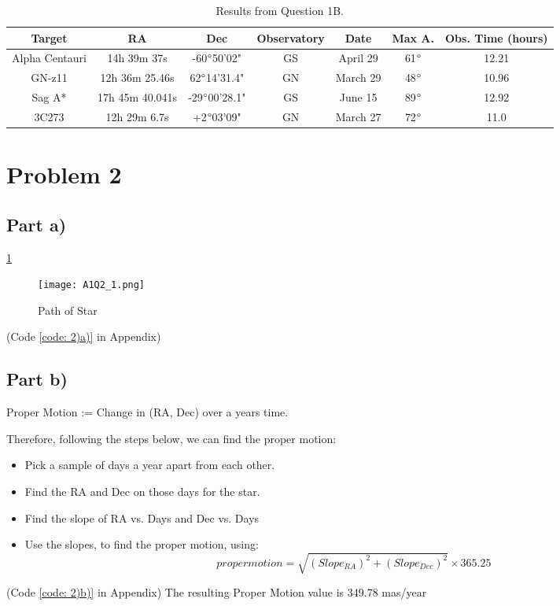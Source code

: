 \documentclass{article}
\begin{document}
        \begin{table}[h!]
        \centering
        \begin{tabular}{|c| c| c| c| c | c | c|} 
         \hline
         Target & RA & Dec & Observatory & Date & Max A. & Obs. Time (hours) \\
         \hline
         \hline
         Alpha Centauri & 14h 39m 37s & -60$\degree$50'02" & GS & April 29 & 61$\degree$ & 12.21 \\
         \hline
         GN-z11 & 12h 36m 25.46s & 62$\degree$14'31.4" & GN & March 29 & 48$\degree$ & 10.96 \\
         \hline
         Sag A* & 17h 45m 40.041s & -29$\degree$00'28.1" & GS & June 15 & 89$\degree$ & 12.92 \\
         \hline
         3C273 & 12h 29m 6.7s & +2$\degree$03'09" & GN & March 27 & 72$\degree$ & 11.0 \\
         \hline
        \end{tabular}
        \caption{Results from Question 1B.}
        \label{table:1}
        \end{table}
        
        
        
\section*{Problem 2}
    \subsection*{Part a)}
        \ref{fig:Path of Star}
        \begin{figure}[htp]
            \centering
            \texttt{[image: A1Q2\_1.png]}
            \caption{Path of Star}
            \label{fig:Path of Star}
        \end{figure}
        (Code \ref{code: 2)a)} in Appendix)
    \subsection*{Part b)}
        Proper Motion := Change in (RA, Dec) over a years time.
        
        Therefore, following the steps below, we can find the proper motion:
        \begin{itemize}
            \item Pick a sample of days a year apart from each other.
            \item Find the RA and Dec on those days for the star.
            \item Find the slope of RA vs. Days and Dec vs. Days
            \item Use the slopes, to find the proper motion, using:
            \[proper motion = \sqrt{(Slope_{RA})^2+(Slope_{Dec})^2}\times 365.25\]
        \end{itemize}
        (Code \ref{code: 2)b)} in Appendix)
        The resulting Proper Motion value is 349.78 mas/year
        
\end{document}
